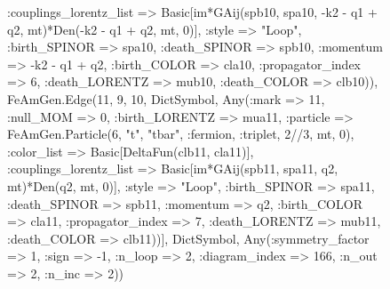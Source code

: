 \documentclass{revtex4}
\begin{document}
\begin{figure}[!htb]
\begin{center}
{:couplings_lorentz_list => Basic[im*GAij(spb10, spa10, -k2 - q1 + q2, mt)*Den(-k2 - q1 + q2, mt, 0)], :style => "Loop", :birth_SPINOR => spa10, :death_SPINOR => spb10, :momentum => -k2 - q1 + q2, :birth_COLOR => cla10, :propagator_index => 6, :death_LORENTZ => mub10, :death_COLOR => clb10)), FeAmGen.Edge(11, 9, 10, Dict{Symbol, Any}(:mark => 11, :null_MOM => 0, :birth_LORENTZ => mua11, :particle => FeAmGen.Particle(6, "t", "tbar", :fermion, :triplet, 2//3, mt, 0), :color_list => Basic[DeltaFun(clb11, cla11)], :couplings_lorentz_list => Basic[im*GAij(spb11, spa11, q2, mt)*Den(q2, mt, 0)], :style => "Loop", :birth_SPINOR => spa11, :death_SPINOR => spb11, :momentum => q2, :birth_COLOR => cla11, :propagator_index => 7, :death_LORENTZ => mub11, :death_COLOR => clb11))], Dict{Symbol, Any}(:symmetry_factor => 1, :sign => -1, :n_loop => 2, :diagram_index => 166, :n_out => 2, :n_inc => 2)) 
}
\end{center}
\end{figure}
\end{document}
